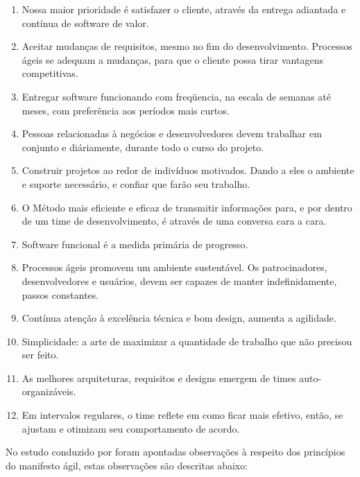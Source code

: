 \begin{enumerate}
    \item Nossa maior prioridade é satisfazer o cliente, através da entrega adiantada e contínua de software de valor.
    \item Aceitar mudanças de requisitos, mesmo no fim do desenvolvimento. Processos ágeis se adequam a mudanças, para que o cliente possa tirar vantagens competitivas.
    \item Entregar software funcionando com freqüencia, na escala de semanas até meses, com preferência aos períodos mais curtos.
    \item Pessoas relacionadas à negócios e desenvolvedores devem trabalhar em conjunto e diáriamente, durante todo o curso do projeto.
    \item Construir projetos ao redor de indivíduos motivados. Dando a eles o ambiente e suporte necessário, e confiar que farão seu trabalho.
    \item O Método mais eficiente e eficaz de transmitir informações para, e por dentro de um time de desenvolvimento, é através de uma conversa cara a cara.
    \item Software funcional é a medida primária de progresso.
    \item Processos ágeis promovem um ambiente sustentável. Os patrocinadores, desenvolvedores e usuários, devem ser capazes de manter indefinidamente, passos constantes.
    \item Contínua atenção à excelência técnica e bom design, aumenta a agilidade.
    \item Simplicidade: a arte de maximizar a quantidade de trabalho que não precisou ser feito.
    \item As melhores arquiteturas, requisitos e designs emergem de times auto-organizáveis.
    \item Em intervalos regulares, o time reflete em como ficar mais efetivo, então, se ajustam e otimizam seu comportamento de acordo.

\end{enumerate}



No estudo conduzido por \cite{waterman2015much} foram apontadas observações à respeito dos princípios do manifesto ágil, estas observações são descritas abaixo:


